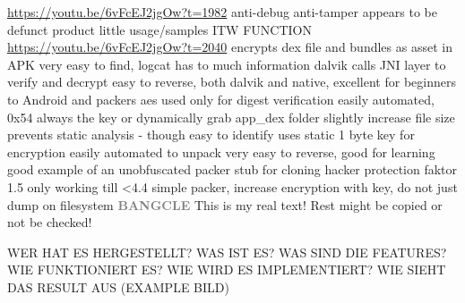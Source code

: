 \url{https://youtu.be/6vFcEJ2jgOw?t=1982}\newline
anti-debug\newline
anti-tamper\newline
appears to be defunct product\newline
little usage/samples ITW\newline
FUNCTION\newline
\url{https://youtu.be/6vFcEJ2jgOw?t=2040}\newline
encrypts dex file and bundles as asset in APK\newline
very easy to find, logcat has to much information\newline
dalvik calls JNI layer to verify and decrypt\newline
easy to reverse, both dalvik and native, excellent for beginners to Android and packers\newline
aes used only for digest verification\newline
easily automated, 0x54 always the key\newline
or dynamically grab app\_dex folder\newline
slightly increase file size\newline
prevents static analysis - though easy to identify\newline
uses static 1 byte key for encryption\newline
easily automated to unpack\newline
very easy to reverse, good for learning\newline
good example of an unobfuscated packer stub for cloning\newline
hacker protection faktor 1.5\newline
only working till <4.4\newline
simple packer, increase encryption with key, do not just dump on filesystem
\newline\newline\textbf{\textcolor{gray}{BANGCLE}}\newline
This is my real text! Rest might be copied or not be checked!



WER HAT ES HERGESTELLT? WAS IST ES? WAS SIND DIE FEATURES? WIE FUNKTIONIERT ES? WIE WIRD ES IMPLEMENTIERT? WIE SIEHT DAS RESULT AUS (EXAMPLE BILD)\newline

